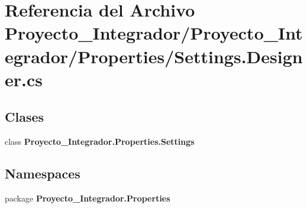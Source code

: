 \section{Referencia del Archivo Proyecto\-\_\-\-Integrador/\-Proyecto\-\_\-\-Integrador/\-Properties/\-Settings.Designer.\-cs}
\label{_proyecto___integrador_2_properties_2_settings_8_designer_8cs}
\subsection*{Clases}
\begin{DoxyCompactItemize}
\item 
class {\bf Proyecto\-\_\-\-Integrador.\-Properties.\-Settings}
\end{DoxyCompactItemize}
\subsection*{Namespaces}
\begin{DoxyCompactItemize}
\item 
package {\bf Proyecto\-\_\-\-Integrador.\-Properties}
\end{DoxyCompactItemize}
